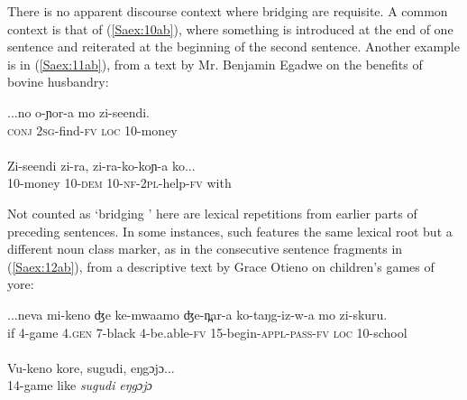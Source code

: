 \documentclass[output=paper]{LSP/langsci}
\begin{document}
There is no apparent discourse context where bridging  are requisite. A common context is that of (\ref{Saex:10ab}), where something is introduced at the end of one sentence and reiterated at the beginning of the second sentence. Another example is in (\ref{Saex:11ab}), from a text by Mr. Benjamin Egadwe on the benefits of bovine husbandry:


\begin{exe}
\ex \label{Saex:11ab}
\begin{xlist}
\ex \label{Saex:11a}
\gll ...no  o-ɲor-a   mo   zi-seendi. \\
 \textsc{conj}  \textsc{2sg}-find-\textsc{fv}  \textsc{loc}  10-money\\
\glt {}\\
\ex \label{Saex:11b}
\gll Zi-seendi   zi-ra,     zi-ra-ko-koɲ-a   ko...\\     	       
  10-money  10-\textsc{dem}  10-\textsc{nf-2pl-}help-\textsc{fv}  with\\
\glt {} 
\end{xlist}
\end{exe}


Not counted as `bridging ' here are lexical repetitions from earlier parts of preceding sentences. In some instances, such  features the same lexical root but a different noun class marker, as in the consecutive sentence fragments in (\ref{Saex:12ab}), from a descriptive text by Grace Otieno on children’s games of yore: 


\begin{exe}
\ex \label{Saex:12ab}
\begin{xlist}
\ex \label{Saex:12a}
\gll ...neva  mi-keno   ʤe   ke-mwaamo  ʤe-n̪ar-a ko-taŋg-iz-w-a     mo   zi-skuru. \\
 if  4-game    4.\textsc{gen}  7-black    4-be.able-\textsc{fv}  15-begin-\textsc{appl}-\textsc{pass}-\textsc{fv}    \textsc{loc}  10-school\\
\glt {}\\
\ex \label{Saex:12b}
\gll Vu-keno   kore,  sugudi,   eŋgɔjɔ...\\     	       
  14-game  like  \textit{sugudi}    \textit{eŋgɔjɔ}\\
\glt {} 
\end{xlist}
\end{exe}
\end{document}
